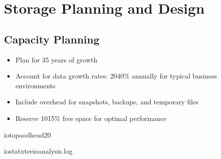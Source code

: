 \documentclass[letterpaper,10pt,english]{sphinxmanual}
\begin{document}
\section{Storage Planning and Design}
\label{\detokenize{best-practices:storage-planning-and-design}}

\subsection{Capacity Planning}
\label{\detokenize{best-practices:capacity-planning}}
\sphinxAtStartPar
{}
\begin{itemize}
\item {} 
\sphinxAtStartPar
Plan for 3\sphinxhyphen{}5 years of growth

\item {} 
\sphinxAtStartPar
Account for data growth rates: 20\sphinxhyphen{}40\% annually for typical business environments

\item {} 
\sphinxAtStartPar
Include overhead for snapshots, backups, and temporary files

\item {} 
\sphinxAtStartPar
Reserve 10\sphinxhyphen{}15\% free space for optimal performance

\end{itemize}

\sphinxAtStartPar
{}

\begin{sphinxVerbatim}[commandchars=\\\{\}]
iotop\PYGZhy{}a\PYGZhy{}o\PYGZhy{}dhead\PYGZhy{}20

iostat\PYGZhy{}xteeio\PYGZhy{}analysis.log

\end{sphinxVerbatim}
\end{document}
